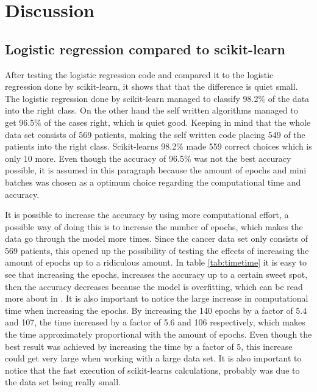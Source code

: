 \documentclass[../main.tex]{subfiles}
\begin{document}
\section{Discussion}
\subsection{Logistic regression compared to scikit-learn}
After testing the logistic regression code and compared it to the logistic regression done by scikit-learn, it shows that that the difference is quiet small. The logistic regression done by scikit-learn managed to classify 98.2\% of the data into the right class. On the other hand the self written algorithms managed to get 96.5\% of the cases right, which is quiet good. Keeping in mind that the whole data set consists of 569 patients, making the self written code placing 549 of the patients into the right class. Scikit-learns 98.2\% made 559 correct choices which is only 10 more. Even though the accuracy of 96.5\% was not the best accuracy possible, it is assumed in this paragraph because the amount of epochs and mini batches was chosen as a optimum choice regarding the computational time and accuracy. 

It is possible to increase the accuracy by using more computational effort, a possible way of doing this is to increase the number of epochs, which makes the data go through the model more times. Since the cancer data set only consists of 569 patients, this opened up the possibility of testing the effects of increasing the amount of epochs up to a ridiculous amount. In table \ref{tab:timetime} it is easy to see that increasing the epochs, increases the accuracy up to a certain sweet spot, then the accuracy decreases because the model is overfitting, which can be read more about in \cite{project2}. It is also important to notice the large increase in computational time when increasing the epochs. By increasing the 140 epochs by a factor of 5.4 and 107, the time increased by a factor of 5.6 and 106 respectively, which makes the time approximately proportional with the amount of epochs. Even though the best result was achieved by increasing the time by a factor of 5, this increase could get very large when working with a large data set. It is also important to notice that the fast execution of scikit-learns calculations, probably was due to the data set being really small.
\end{document}
